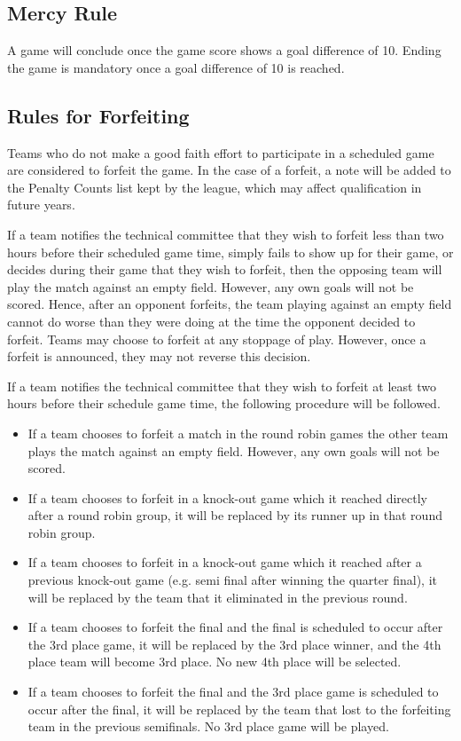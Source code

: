 \documentclass[12pt]{article}
\begin{document}
\subsection{Mercy Rule}
\label{sec:mercy_rule}
A game will conclude once the game score shows a goal difference of 10.  Ending the game is mandatory once a goal difference of 10 is reached.

\subsection{Rules for Forfeiting}
\label{sec:forfeit}

Teams who do not make a good faith effort to participate in a scheduled game are considered to forfeit the game.  In the case of a forfeit, a note will be added to the Penalty Counts list kept by the league, which may affect qualification in future years.

If a team notifies the technical committee that they wish to forfeit less than two hours before their scheduled game time, simply fails to show up for their game, or decides during their game that they wish to forfeit, then the opposing team will play the match against an empty field.  However, any own goals will not be scored.  Hence, after an opponent forfeits, the team playing against an empty field cannot do worse than they were doing at the time the opponent decided to forfeit.  Teams may choose to forfeit at any stoppage of play.  However, once a forfeit is announced, they may not reverse this decision.

If a team notifies the technical committee that they wish to forfeit at least two hours before their schedule game time, the following procedure will be followed.

\begin{itemize}
\item If a team chooses to forfeit a match in the round robin games the other team plays the match against an empty field.  However, any own goals will not be scored.
\item If a team chooses to forfeit in a knock-out game which it reached directly after a round robin group, it will be replaced by its runner up in that round robin group.
\item If a team chooses to forfeit in a knock-out game which it reached after a previous knock-out game (e.g. semi final after winning the quarter final), it will be replaced by the team that it eliminated in the previous round.
\item If a team chooses to forfeit the final and the final is scheduled to occur after the 3rd place game, it will be replaced by the 3rd place winner, and the 4th place team will become 3rd place. No new 4th place will be selected.
\item If a team chooses to forfeit the final and the 3rd place game is scheduled to occur after the final, it will be replaced by the team that lost to the forfeiting team in the previous semifinals. No 3rd place game will be played.
\end{itemize}
\end{document}
